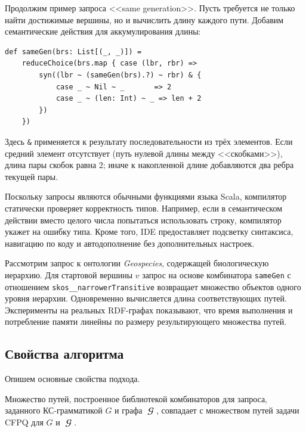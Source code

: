 Продолжим пример запроса <<same generation>>.
Пусть требуется не только найти достижимые вершины, но и вычислить длину каждого пути.
Добавим семантические действия для аккумулирования длины:

\begin{verbatim}
def sameGen(brs: List[(_, _)]) =
    reduceChoice(brs.map { case (lbr, rbr) =>
        syn((lbr ~ (sameGen(brs).?) ~ rbr) & {
            case _ ~ Nil ~ _       => 2
            case _ ~ (len: Int) ~ _ => len + 2
        })
    })
\end{verbatim}

Здесь \texttt{\&} применяется к результату последовательности из трёх элементов.
Если средний элемент отсутствует (путь нулевой длины между <<скобками>>), длина пары скобок равна 2; иначе к накопленной длине добавляются два ребра текущей пары.

Поскольку запросы являются обычными функциями языка Scala, компилятор статически проверяет корректность типов.
Например, если в семантическом действии вместо целого числа попытаться использовать строку, компилятор укажет на ошибку типа.
Кроме того, IDE предоставляет подсветку синтаксиса, навигацию по коду и автодополнение без дополнительных настроек.

\begin{example}
    Рассмотрим запрос к онтологии \emph{Geospecies}, содержащей биологическую иерархию.
    Для стартовой вершины $v$ запрос на основе комбинатора \texttt{sameGen} с отношением \texttt{skos\_\_narrowerTransitive} возвращает множество объектов одного уровня иерархии.
    Одновременно вычисляется длина соответствующих путей.
    Эксперименты на реальных RDF-графах показывают, что время выполнения и потребление памяти линейны по размеру результирующего множества путей.
\end{example}

\subsection{Свойства алгоритма}
\label{subsec:CFPQ_Combinators_properties}

Опишем основные свойства подхода.

\begin{theorem}[Корректность]
    Множество путей, построенное библиотекой комбинаторов для запроса, заданного КС-грамматикой $G$ и графа $\mbfscrG$, совпадает с множеством путей задачи CFPQ для $G$ и $\mbfscrG$.
\end{theorem}


